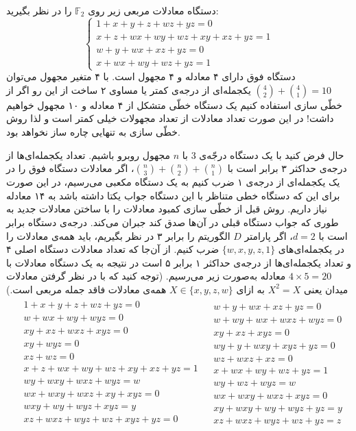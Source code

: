 \begin{example}
	دستگاه معادلات مربعی زیر روی 
	$\mathbb{F}_{2}$
	را در نظر بگیرید:
	$$\left \{ \begin{array}{l}
	1+x+y+z+wz+yz = 0\\
	x+z+wx+wy+wz+xy+xz+yz = 1\\
	w+y+wx+xz+yz = 0\\
	x+wx+wy+wz+yz = 1
	\end{array} \right.$$
	دستگاه فوق دارای ۴ معادله و ۴ مجهول است. با ۴ متغیر مجهول می‌توان
	$\binom{4}{2}+\binom{4}{1} = 10$
	یکجمله‌ای از درجه‌ی کمتر یا مساوی ۲ ساخت از این رو اگر از خطّی سازی استفاده کنیم یک دستگاه خطّی متشکل از ۴ معادله و ۱۰ مجهول خواهیم داشت! در این صورت تعداد معادلات از تعداد مجهولات خیلی کمتر است و لذا روش خطّی سازی به تنهایی چاره ساز نخواهد بود.
	
	
	حال فرض کنید با یک دستگاه درجّه‌ی 
	$3$
	با 
	$n$
	مجهول روبرو باشیم. تعداد یکجمله‌ای‌ها از درجه‌ی حداکثر ۳ برابر است با
$\binom{n}{3}+\binom{n}{2}+\binom{n}{1}$،
	اگر معادلات دستگاه فوق را در یک یکجمله‌ای از درجه‌ی ۱ ضرب کنیم به یک دستگاه مکعبی می‌رسیم، در این صورت برای این که دستگاه خطی متناظر با این دستگاه جواب یکتا داشته باشد به ۱۴ معادله نیاز داریم. روش 
	قبل از خطّی سازی کمبود معادلات را با ساختن معادلات جدید به طوری که جواب دستگاه قبلی در آن‌ها صدق کند جبران می‌کند. درجه‌ی دستگاه برابر است با 
	$d =2$،
	اگر پارامتر 
	$D$
	الگوریتم 
	را برابر ۳ در نظر بگیریم، باید همه‌ی معادلات را در یکجمله‌ای‌های 
	$\{w,x,y,z,1\}$
	ضرب کنیم. از آن‌جا که تعداد معادلات دستگاه اصلی ۴ و تعداد یکجمله‌ای‌ها از درجه‌ی حداکثر ۱ برابر ۵ است در نتیجه به یک دستگاه معادلات با 
	$4\times 5 = 20$
	معادله به‌صورت زیر می‌رسیم. (توجه کنید که با در نظر گرفتن معادلات میدان یعنی 
	$X^{2} = X$
	به ازای 
	$X\in\{x,y,z,w\}$
	همه‌ی معادلات فاقد جمله  مربعی است.) 
\begin{align*}
\begin{split}
&1+x+y+z+wz+yz = 0\\
&w+wx+wy+wyz = 0\\
&xy+xz+wxz+xyz = 0\\
&xy+wyz = 0\\
&xz + wz = 0\\
&x+z+wx+wy+wz+xy+xz+yz = 1\\
&wy+wxy+wxz+wyz = w\\
&wx+wxy+wxz+xy+xyz = 0\\
&wxy+wy+wyz+xyz = y\\
&xz+wxz+wyz+wz+xyz+yz =0\\
\end{split}
\begin{split}
&w+y+wx+xz+yz = 0\\
&w+wy+wx+wxz+wyz = 0\\
&xy+xz+xyz = 0\\
&wy+y+wxy+xyz+yz = 0\\
&wz+wxz+xz = 0\\
&x+wx+wy+wz+yz = 1\\
&wy+wz+wyz = w\\
&wx+wxy+wxz+xyz = 0\\
&xy+wxy+wy+wyz+yz = y\\
&xz+wxz+wyz+wz+yz = z
\end{split}
\end{align*}


\end{example}
